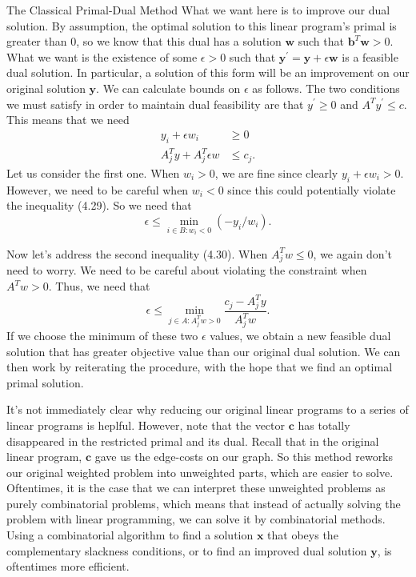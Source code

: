 \begin{section}{The Classical Primal-Dual Method}
	What we want here is to improve our dual solution. By assumption, the optimal solution to this 
	linear program's primal is greater than 0, so we know that this dual has a solution 
	$\mathbf{w}$ such that $\mathbf{b}^{T}\mathbf{w} > 0$. What we want is the existence of 
	some $\epsilon > 0$ such that $\mathbf{y}^{'} = \mathbf{y} + \epsilon \mathbf{w}$ is a 
	feasible dual solution. In particular, a solution of this form will be an improvement on our 
	original solution $\mathbf{y}$. We can calculate bounds on $\epsilon$ as follows. The two 
	conditions we must satisfy in order to maintain dual feasibility are that $y^{'} \geq 0$ and 
	$A^{T}y^{'} \leq c$. This means that we need 
	\begin{align}
		y_i + \epsilon w_i &\geq 0 \\
		A^{T}_j y + A^T_j \epsilon w & \leq c_j.
	\end{align}
	Let us consider the first one. When $w_i > 0$, we are fine since clearly 
	$y_i +\epsilon w_i > 0$. However, we need to be careful when 
	$w_i < 0$ since this could potentially violate the inequality (4.29). So we need that
	\[
		\epsilon \leq \min_{i\in B: w_i < 0} (-y_i/w_i).
	\]

	Now let's address the second inequality (4.30). When $A^{T}_jw \leq 0$, we again don't need 
	to worry. We 
	need to be careful about violating the constraint when $A^{T}w > 0$. Thus, we need that
	\[
		\epsilon \leq \min_{j\in A: A^{T}_jw > 0} \frac{c_j-A^{T}_jy}{A^{T}_j w}.
	\]
	If we choose the minimum of these two $\epsilon$ values, we obtain a new feasible dual solution 
	that has greater objective value than our original dual solution. 
	We can then work by reiterating the procedure, with the hope that we find an optimal primal 
	solution.

	It's not immediately clear why reducing our original linear programs to a series of linear 
	programs is heplful. However,  note that the vector $\mathbf{c}$ has totally disappeared in 
	the restricted primal and its dual. Recall that in the original linear program, $\mathbf{c}$ 
	gave us the edge-costs on our graph. So this method reworks our original weighted problem 
	into unweighted parts, which are easier to solve. Oftentimes, it is the case that 
	we can interpret these unweighted problems as purely combinatorial problems, which means that 
	instead of actually solving the problem with linear programming, we can solve it by 
	combinatorial methods. 
	Using a combinatorial algorithm to find a solution $\mathbf{x}$ that obeys the 
	complementary slackness conditions, or to find an improved dual solution $\mathbf{y}$, is 
	oftentimes more efficient.
\end{section}
	
